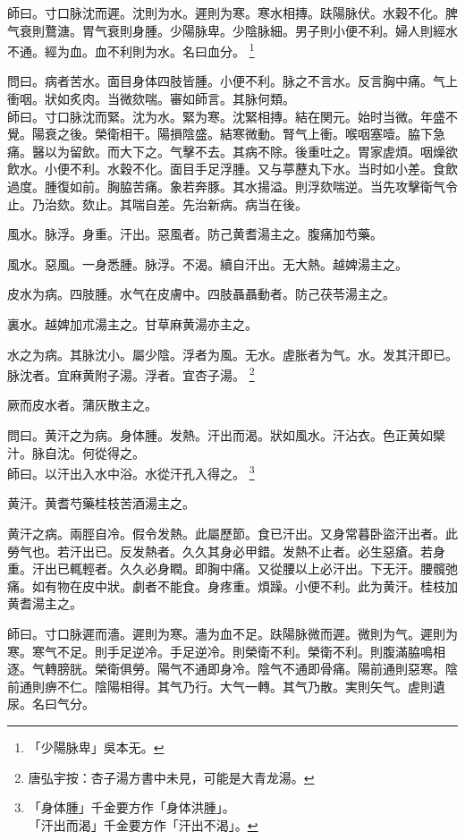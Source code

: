 \documentclass[b5paper,twoside,zihao=-4,UTF8]{ctexbook}
\begin{document}
師曰。寸口脉沈而遲。沈則为水。遲則为寒。寒水相摶。趺陽脉伏。水穀不化。脾气衰則鶩溏。胃气衰則身腫。少陽脉卑。少陰脉細。男子則小便不利。婦人則經水不通。經为血。血不利則为水。名曰血分。
	\footnote{「少陽脉卑」吳本无。}

問曰。病者苦水。面目身体四肢皆腫。小便不利。脉之不言水。反言胸中痛。气上衝咽。狀如炙肉。当微欬喘。審如師言。其脉何類。\\
師曰。寸口脉沈而緊。沈为水。緊为寒。沈緊相摶。結在関元。始时当微。年盛不覺。陽衰之後。榮衛相干。陽損陰盛。結寒微動。腎气上衝。喉咽塞噎。脇下急痛。醫以为留飲。而大下之。气擊不去。其病不除。後重吐之。胃家虗煩。咽燥欲飲水。小便不利。水穀不化。面目手足浮腫。又与葶藶丸下水。当时如小差。食飲過度。腫復如前。胸脇苦痛。象若奔豚。其水揚溢。則浮欬喘逆。当先攻擊衛气令止。乃治欬。欬止。其喘自差。先治新病。病当在後。

風水。脉浮。身重。汗出。惡風者。防己黄耆湯主之。腹痛加芍藥。

風水。惡風。一身悉腫。脉浮。不渴。續自汗出。无大熱。越婢湯主之。

皮水为病。四肢腫。水气在皮膚中。四肢聶聶動者。防己茯苓湯主之。

裏水。越婢加朮湯主之。甘草麻黄湯亦主之。

水之为病。其脉沈小。屬少陰。浮者为風。无水。虗胀者为气。水。发其汗即已。脉沈者。宜麻黄附子湯。浮者。宜杏子湯。
	\footnote{唐弘宇按：杏子湯方書中未見，可能是大青龙湯。}

厥而皮水者。蒲灰散主之。

問曰。黄汗之为病。身体腫。发熱。汗出而渴。狀如風水。汗沾衣。色正黄如檗汁。脉自沈。何從得之。\\
師曰。以汗出入水中浴。水從汗孔入得之。
	\footnote{「身体腫」千金要方作「身体洪腫」。\\「汗出而渴」千金要方作「汗出不渴」。}

黄汗。黄耆芍藥桂枝苦酒湯主之。

黄汗之病。兩脛自冷。假令发熱。此屬歷節。食已汗出。又身常暮{卧}盜汗出者。此勞气也。若汗出已。反发熱者。久久其身必甲錯。发熱不止者。必生惡瘡。若身重。汗出已輒輕者。久久必身瞤。即胸中痛。又從腰以上必汗出。下无汗。腰髖弛痛。如有物在皮中狀。劇者不能食。身疼重。煩躁。小便不利。此为黄汗。桂枝加黄耆湯主之。

師曰。寸口脉遲而濇。遲則为寒。濇为血不足。趺陽脉微而遲。微則为气。遲則为寒。寒气不足。則手足逆冷。手足逆冷。則榮衛不利。榮衛不利。則腹滿脇鳴相逐。气轉膀胱。榮衛俱勞。陽气不通即身冷。陰气不通即骨痛。陽前通則惡寒。陰前通則痹不仁。陰陽相得。其气乃行。大气一轉。其气乃散。実則矢气。虗則遺尿。名曰气分。
\end{document}

